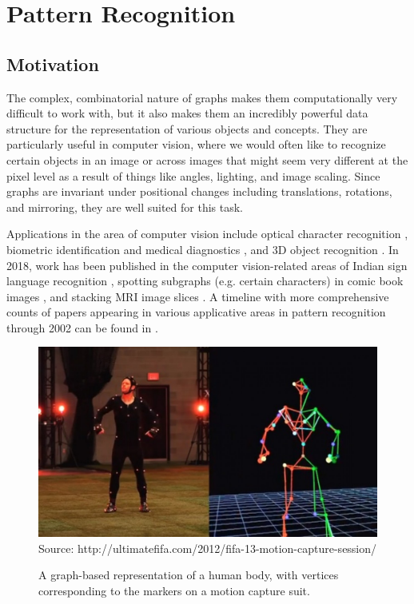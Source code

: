 \documentclass[12pt]{thesis}
\theoremstyle{plain}
\theoremstyle{definition}
\theoremstyle{remark}
\begin{document}








\chapter{Pattern Recognition}\label{chapter:pattern_recognition}
 
\section{Motivation}

The complex, combinatorial nature of graphs makes them computationally very difficult to work with, but it also makes them an incredibly powerful data structure for the representation of various objects and concepts. They are particularly useful in computer vision, where we would often like to recognize certain objects in an image or across images that might seem very different at the pixel level as a result of things like angles, lighting, and image scaling. Since graphs are invariant under positional changes including translations, rotations, and mirroring, they are well suited for this task.

Applications in the area of computer vision include optical character recognition \cite{Lu_1991,Rocha_1994}, biometric identification \cite{isenor1986fingerprint,deng2010retinal} and medical diagnostics \cite{sharma2012determining}, and 3D object recognition \cite{Christmas_1995}. In 2018, work has been published in the computer vision-related areas of Indian sign language recognition \cite{Kumar_2018a,Kumar_2018b}, spotting subgraphs (e.g. certain characters) in comic book images \cite{le2018ssgci}, and stacking MRI image slices \cite{clough2018mri}. A timeline with more comprehensive counts of papers appearing in various applicative areas in pattern recognition through 2002 can be found in \cite{Conte_2004}.

\begin{figure}[h!]
\centering
\includegraphics[width=\textwidth]{motion_capture_demo.png}
\scriptsize Source: http://ultimatefifa.com/2012/fifa-13-motion-capture-session/
\caption{A graph-based representation of a human body, with vertices corresponding to the markers on a motion capture suit.}
\label{motion_capture_demo}
\end{figure}
\end{document}
